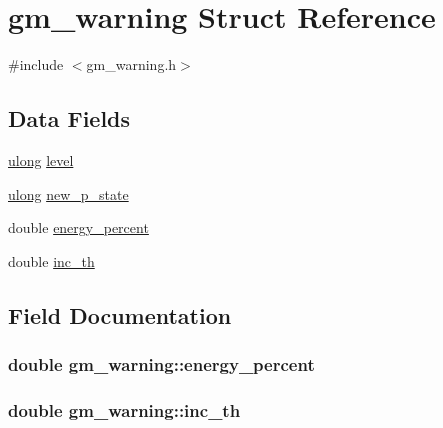 \hypertarget{structgm__warning}{}\section{gm\+\_\+warning Struct Reference}
\label{structgm__warning}


{\ttfamily \#include $<$gm\+\_\+warning.\+h$>$}

\subsection*{Data Fields}
\begin{DoxyCompactItemize}
\item 
\hyperlink{generic_8h_a718b4eb2652c286f4d42dc18a8e71a1a}{ulong} \hyperlink{structgm__warning_ab40ebdbfed4f2e27c96eee75d383e018}{level}
\item 
\hyperlink{generic_8h_a718b4eb2652c286f4d42dc18a8e71a1a}{ulong} \hyperlink{structgm__warning_ab654751d95f0ea84589ada162d7d67fe}{new\+\_\+p\+\_\+state}
\item 
double \hyperlink{structgm__warning_a71739c7f115bb9eadec41331993bce3a}{energy\+\_\+percent}
\item 
double \hyperlink{structgm__warning_a2cb77f1c131cb14ae1247b7e148d20f0}{inc\+\_\+th}
\end{DoxyCompactItemize}


\subsection{Field Documentation}
\subsubsection[{\texorpdfstring{energy\+\_\+percent}{energy_percent}}]{\setlength{\rightskip}{0pt plus 5cm}double gm\+\_\+warning\+::energy\+\_\+percent}\hypertarget{structgm__warning_a71739c7f115bb9eadec41331993bce3a}{}\label{structgm__warning_a71739c7f115bb9eadec41331993bce3a}
\subsubsection[{\texorpdfstring{inc\+\_\+th}{inc_th}}]{\setlength{\rightskip}{0pt plus 5cm}double gm\+\_\+warning\+::inc\+\_\+th}\hypertarget{structgm__warning_a2cb77f1c131cb14ae1247b7e148d20f0}{}\label{structgm__warning_a2cb77f1c131cb14ae1247b7e148d20f0}
